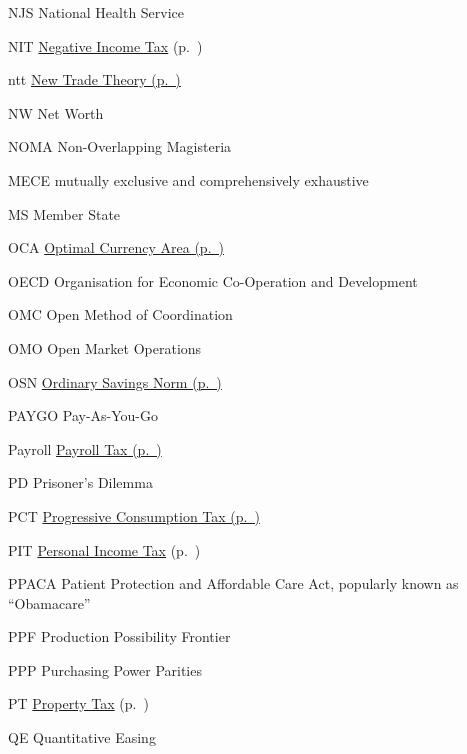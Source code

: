 	{NJS}
	{National Health Service}

	{NIT}
	{\hyperref[sec:NIT]{Negative Income Tax} (p.~\pageref{sec:NIT})}

	{ntt}
	{\hyperref[itm:NTT]{New Trade Theory (p.~\pageref{itm:NTT})}}

	{NW}
	{Net Worth}

	{NOMA}
	{Non-Overlapping Magisteria}

	{MECE}
	{mutually exclusive and comprehensively exhaustive}

	{MS}
	{Member State}

	{OCA}
	{\hyperref[sec:OCA]{Optimal Currency Area (p.~\pageref{sec:OCA})}}

	{OECD}
	{Organisation for Economic Co-Operation and Development}

	{OMC}
	{Open Method of Coordination}

	{OMO}
	{Open Market Operations}

	{OSN}
	{\hyperref[sec:OSN]{Ordinary Savings Norm (p.~\pageref{sec:OSN})}}

	{PAYGO}
	{Pay-As-You-Go}

	{Payroll}
	{\hyperref[sec:Payroll]{Payroll Tax (p.~\pageref{sec:Payroll})}}

	{PD}
	{Prisoner's Dilemma}

	{PCT}
	{\hyperref[sec:PCT]{Progressive Consumption Tax (p.~\pageref{sec:PCT})}}

	{PIT}
	{\hyperref[sec:PIT]{Personal Income Tax} (p.~\pageref{sec:PIT})}

	{PPACA}
	{Patient Protection and Affordable Care Act, popularly known as ``Obamacare''}

	{PPF}
	{Production Possibility Frontier}

	{PPP}
	{Purchasing Power Parities}

	{PT}
	{\hyperref[sec:PT]{Property Tax} (p.~\pageref{sec:PT})}

	{QE}
	{Quantitative Easing}

